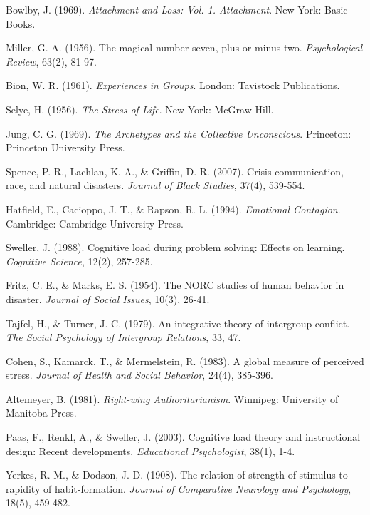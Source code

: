 \documentclass[11pt,a4paper]{article}
\begin{document}
\begin{thebibliography}{99}
 Bowlby, J. (1969). \textit{Attachment and Loss: Vol. 1. Attachment}. New York: Basic Books.

 Miller, G. A. (1956). The magical number seven, plus or minus two. \textit{Psychological Review}, 63(2), 81-97.

 Bion, W. R. (1961). \textit{Experiences in Groups}. London: Tavistock Publications.

 Selye, H. (1956). \textit{The Stress of Life}. New York: McGraw-Hill.

 Jung, C. G. (1969). \textit{The Archetypes and the Collective Unconscious}. Princeton: Princeton University Press.

 Spence, P. R., Lachlan, K. A., \& Griffin, D. R. (2007). Crisis communication, race, and natural disasters. \textit{Journal of Black Studies}, 37(4), 539-554.

 Hatfield, E., Cacioppo, J. T., \& Rapson, R. L. (1994). \textit{Emotional Contagion}. Cambridge: Cambridge University Press.

 Sweller, J. (1988). Cognitive load during problem solving: Effects on learning. \textit{Cognitive Science}, 12(2), 257-285.

 Fritz, C. E., \& Marks, E. S. (1954). The NORC studies of human behavior in disaster. \textit{Journal of Social Issues}, 10(3), 26-41.

 Tajfel, H., \& Turner, J. C. (1979). An integrative theory of intergroup conflict. \textit{The Social Psychology of Intergroup Relations}, 33, 47.

 Cohen, S., Kamarck, T., \& Mermelstein, R. (1983). A global measure of perceived stress. \textit{Journal of Health and Social Behavior}, 24(4), 385-396.

 Altemeyer, B. (1981). \textit{Right-wing Authoritarianism}. Winnipeg: University of Manitoba Press.

 Paas, F., Renkl, A., \& Sweller, J. (2003). Cognitive load theory and instructional design: Recent developments. \textit{Educational Psychologist}, 38(1), 1-4.

 Yerkes, R. M., \& Dodson, J. D. (1908). The relation of strength of stimulus to rapidity of habit‐formation. \textit{Journal of Comparative Neurology and Psychology}, 18(5), 459-482.


\end{thebibliography}
\end{document}
